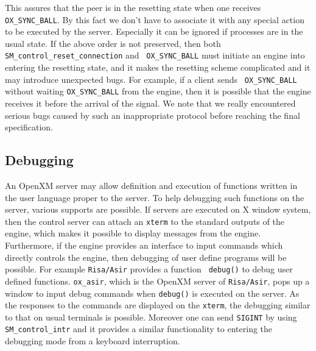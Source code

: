 This assures that the peer is in the resetting state when one receives
{\tt OX\_SYNC\_BALL}. By this fact we don't have to associate it with
any special action to be executed by the server. Especially it can be
ignored if processes are in the usual state. If the above order is not
preserved, then both {\tt SM\_control\_reset\_connection} and {\tt
OX\_SYNC\_BALL} must initiate an engine into entering the resetting
state, and it makes the resetting scheme complicated and it may
introduce unexpected bugs. For example, if a client sends {\tt
OX\_SYNC\_BALL} without waiting {\tt OX\_SYNC\_BALL} from the engine,
then it is possible that the engine receives it before the arrival of
the signal. We note that we really encountered serious bugs caused
by such an inappropriate protocol before reaching the final specification.

\subsection{Debugging}
An OpenXM server may allow definition and execution of functions
written in the user language proper to the server.  To help debugging
such functions on the server, various supports are possible. If
servers are executed on X window system, then the control server can
attach an {\tt xterm} to the standard outputs of the engine, which
makes it possible to display messages from the engine. Furthermore, if
the engine provides an interface to input commands which directly
controls the engine, then debugging of user define programs will be
possible. For example {\tt Risa/Asir} provides a function {\tt
debug()} to debug user defined functions. {\tt ox\_asir}, which is
the OpenXM server of {\tt Risa/Asir}, pops up a window to input
debug commands when {\tt debug()} is executed on the server.
As the responses to the commands are displayed on the {\tt xterm},
the debugging similar to that on usual terminals is possible.
Moreover one can send {\tt SIGINT} by using {\tt SM\_control\_intr}
and it provides a similar functionality to entering the debugging
mode from a keyboard interruption.
